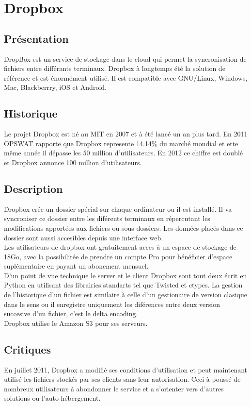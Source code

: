 \chapter{Dropbox}
\thispagestyle{EIP} %
\section{Présentation}
DropBox est un service de stockage dans le cloud qui permet la syncronisation de fichiers entre différants terminaux. Dropbox à longtemps été la solution de référence et est énormément utilisé. Il est compatible avec GNU/Linux, Windows, Mac, Blackberrry, iOS et Android.\\

\section{Historique}
Le projet Dropbox est né au MIT en 2007 et à été lancé un an plus tard. En 2011 OPSWAT rapporte que Dropbox represente 14.14\% du marché mondial et ette même année il dépasse les 50 million d'utilisateurs. En 2012 ce chiffre est doublé et Dropbox annonce 100 million d'utilisateurs.\\

\section{Description}
Dropbox crée un dossier spécial sur chaque ordinateur ou il est installé. Il va syncroniser ce dossier entre les diférents terminaux en répercutant les modifications apportées aux fichiers ou sous-dossiers. Les données placés dans ce dossier sont aussi accesibles depuis une interface web.\\

Les utilisateurs de dropbox ont gratuitement acces à un espace de stockage de 18Go, avec la possibilitée de prendre un compte Pro pour bénéficier d'espace suplémentaire en payant un abonement mensuel.\\

D'un point de vue technique le server et le client Dropbox sont tout deux écrit en Python en utilisant des librairies standarts tel que Twisted et ctypes. La gestion de l'historique d'un fichier est similaire à celle d'un gestionaire de version clasique dans le sens ou il enregistre uniquement les diférences entre deux version succesive d'un fichier, c'est le delta encoding.\\

Dropbox utilise le Amazon S3 pour ses serveurs.\\

\section{Critiques}

En juillet 2011, Dropbox a modifié ses conditions d'utilisation et peut maintenant utilisé les fichiers stockés par ses clients sans leur autorisation. Ceci à poussé de nombreux utilisateurs à abondonner le service et a s'orienter vers d'autres solutions ou l'auto-hébergement.\\
